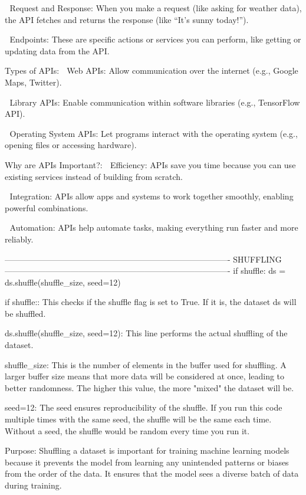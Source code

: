🔷 Request and Response:
When you make a request (like asking for weather data), the API fetches and returns the response (like “It’s sunny today!”).

🔷 Endpoints:
These are specific actions or services you can perform, like getting or updating data from the API.

Types of APIs:
🔷 Web APIs:
Allow communication over the internet (e.g., Google Maps, Twitter).

🔷 Library APIs:
Enable communication within software libraries (e.g., TensorFlow API).

🔷 Operating System APIs:
Let programs interact with the operating system (e.g., opening files or accessing hardware).

Why are APIs Important?:
🔷 Efficiency:
APIs save you time because you can use existing services instead of building from scratch.

🔷 Integration:
APIs allow apps and systems to work together smoothly, enabling powerful combinations.

🔷 Automation:
APIs help automate tasks, making everything run faster and more reliably.

----------------------------------------------------------------------------------
SHUFFLING🔀
----------------------------------------------------------------------------------
if shuffle:
        ds = ds.shuffle(shuffle_size, seed=12)
        
if shuffle::
This checks if the shuffle flag is set to True. If it is, the dataset ds will be shuffled.

ds.shuffle(shuffle_size, seed=12):
This line performs the actual shuffling of the dataset.

shuffle_size:
This is the number of elements in the buffer used for shuffling. A larger buffer size means that more data will be considered at once, leading to better randomness. The higher this value, the more "mixed" the dataset will be.

seed=12:
The seed ensures reproducibility of the shuffle. If you run this code multiple times with the same seed, the shuffle will be the same each time. Without a seed, the shuffle would be random every time you run it.

Purpose:
Shuffling a dataset is important for training machine learning models because it prevents the model from learning any unintended patterns or biases from the order of the data. It ensures that the model sees a diverse batch of data during training.
